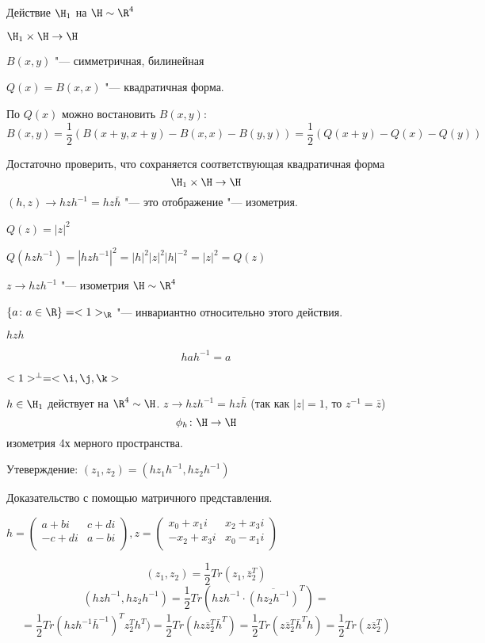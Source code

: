 Действие $\H_1$ на $\H \sim \R^4$

$\H_1 \times \H \to \H$

$B(x, y)$ "--- симметричная, билинейная

$Q(x) = B(x, x)$  "--- квадратичная форма.

По $Q(x)$ можно востановить $B(x, y):$
$$B(x, y) = \frac{1}{2}(B(x + y, x + y) - B(x, x) - B(y, y)) = \frac{1}{2}(Q(x + y) - Q(x) - Q(y))$$

Достаточно проверить, что сохраняется соответствующая квадратичная форма
$$\H_1\times \H \to \H $$
$(h, z) \to hzh^{-1}  = hz\bar h$  "--- это отображение "--- изометрия.

$Q(z) = |z|^2$

$Q(hzh^{-1}) = |hzh^{-1}|^2 = |h|^2|z|^2|h|^{-2} = |z|^2 = Q(z)$

$z \to hzh^{-1}$ "--- изометрия $\H \sim \R^4$

$\{a\colon a \in \R\} = <1>_{\R}$ "--- инвариантно относительно этого действия.

$hzh$

$$hah^{-1} = a$$

$<1>^\bot = <\i, \j, \k>$

$h \in \H_1$ действует на $\R^4 \sim \H$.
$z \to hzh^{-1} = hz\bar h$ (так как $|z| = 1$, то $z^{-1} = \bar z$)
$$\phi_h \colon \H \to \H$$
изометрия 4х мерного пространства.
  
Утеверждение: $(z_1, z_2) = (hz_1h^{-1}, hz_2h^{-1})$

\begin{Rem}
Доказательство с помощью матричного представления.

$h = \begin{pmatrix}
a+bi & c + di\\
-c + di & a - bi\\
\end{pmatrix},
z =
\begin{pmatrix}
x_0 + x_1i & x_2 + x_3i\\
-x_2 + x_3i & x_0 - x_1i\\
\end{pmatrix}
$

$$(z_1, z_2) = \frac{1}{2}Tr(z_1, \bar z_2^T)$$
$$(hzh^{-1}, hz_2h^{-1}) = \frac{1}{2}Tr(hzh^{-1}\cdot \overline{(h z_2 h^{-1})}^T) = $$
$$= \frac{1}{2}Tr(hzh^{-1}\bar h^{-1})^Tz_2^Th^T) = \frac{1}{2}Tr(hz\bar z_2^T \bar h^T) = \frac{1}{2}Tr(z\bar z_2^T\bar h^Th) = \frac{1}{2}Tr(z\bar z_2^T)$$

\end{Rem}

